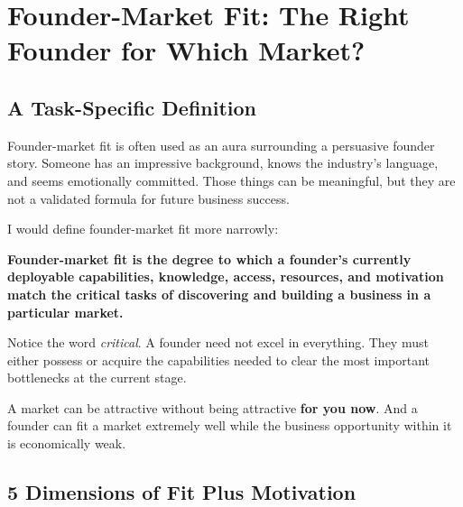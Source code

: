 \section{Founder-Market Fit: The Right Founder for Which Market?}

\subsection{A Task-Specific Definition}

Founder-market fit is often used as an aura surrounding a persuasive founder story. Someone has an impressive background, knows the industry's language, and seems emotionally committed. Those things can be meaningful, but they are not a validated formula for future business success.

I would define founder-market fit more narrowly:

\begin{tcolorbox}[
  enhanced,
  colback=BayesPale!25!white,
  colframe=BayesBorder!60!white,
  boxrule=0.4pt,
  arc=2pt,
  left=6pt,right=6pt,top=4pt,bottom=4pt,
  before skip=3pt,after skip=4pt
]
\footnotesize\color{BayesInk}
\textbf{Founder-market fit is the degree to which a founder's currently deployable capabilities, knowledge, access, resources, and motivation match the critical tasks of discovering and building a business in a particular market.}
\end{tcolorbox}

Notice the word \textit{critical}. A founder need not excel in everything. They must either possess or acquire the capabilities needed to clear the most important bottlenecks at the current stage.

A market can be attractive without being attractive \textbf{for you now}. And a founder can fit a market extremely well while the business opportunity within it is economically weak.

\subsection{5 Dimensions of Fit Plus Motivation}

